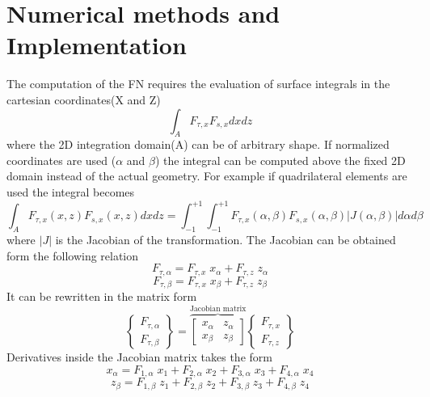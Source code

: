 \documentclass[a4paper,12pt]{article}
\begin{document}
\section*{Numerical methods and Implementation}
\indent\indent\indent\indent The computation of the FN requires the evaluation of surface integrals in the cartesian coordinates(X and Z)
$$\int_{A}^{} F_{\tau,x} F_{s,x} dx dz $$ where the 2D integration domain(A) can be of arbitrary shape. If normalized coordinates are used ($\alpha$ and $\beta$)
the integral can be computed above the fixed 2D domain instead of the actual geometry. For example if quadrilateral elements are used the integral becomes $$ \int_{A}^{} F_{\tau,x}(x,z) F_{s,x}(x,z)dxdz = \int_{-1}^{+1}\int_{-1}^{+1} F_{\tau,x}(\alpha,\beta) F_{s,x}(\alpha,\beta) |J(\alpha,\beta)| d\alpha  d\beta$$ where $|J|$ is the Jacobian of the transformation. The Jacobian can be obtained form the following relation $$ F_{\tau,\alpha} = F_{\tau,x}\;x_{\alpha} + F_{\tau,z}\; z_{\alpha}$$ $$F_{\tau,\beta} = F_{\tau,x}\;x_{\beta} + F_{\tau,z}\; z_{\beta}$$
It can be rewritten in the matrix form 
$$
\begin{Bmatrix}
F_{\tau,\alpha}\\
F_{\tau,\beta}   
\end{Bmatrix}
=
\overbrace{
\begin{bmatrix}
x_{\alpha} & z_{\alpha} \\
x_{\beta} & z_{\beta}
\end{bmatrix}
}^\text{Jacobian matrix}
\begin{Bmatrix}
F_{\tau,x}\\
F_{\tau,z}   
\end{Bmatrix}
$$
Derivatives inside the Jacobian matrix takes the form 
$$x_{\alpha} = F_{1 ,\alpha}\;x_{1} + F_{2 ,\alpha}\;x_{2} + F_{3 ,\alpha}\;x_{3} + F_{4 ,\alpha}\;x_{4}
$$ $$z_{\beta} = F_{1 ,\beta}\;z_{1} + F_{2 ,\beta}\;z_{2} + F_{3 ,\beta}\;z_{3} + F_{4 ,\beta}\;z_{4}$$\\
\end{document}
